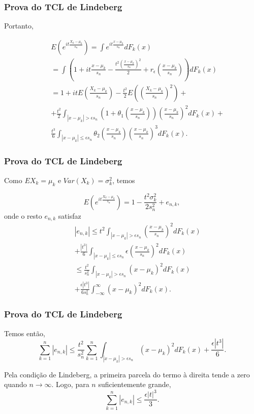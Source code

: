 \begin{frame}
\frametitle{\textbf{Prova do TCL de Lindeberg}}
\baselineskip=13pt
\begin{block}{}


Portanto,

\begin{eqnarray}
& & E(e^{it\frac{X_k-\mu_k}{s_n}})=\int
e^{it\frac{x-\mu_k}{s_n}}dF_k(x)\nonumber\\
& & =\int
(1+it\frac{x-\mu_k}{s_n}-\frac{t^2(\frac{x-\mu_k}{s_n})^2}{2}+ r_{\epsilon}(\frac{x-\mu_k}{s_n}))dF_k(x) \nonumber
\\
& &= 1+it
E(\frac{X_k-\mu_k}{s_n})-\frac{t^2}{2}E((\frac{X_k-\mu_k}{s_n})^2)+\nonumber\\
& & + \frac{t^2}{2}\int_{|x-\mu_k|>\epsilon
s_n}(1+\theta_1(\frac{x-\mu_k}{s_n}))(\frac{x-\mu_k}{s_n})^2dF_k(x)+\nonumber
\\
& & \frac{t^3}{6}\int_{|x-\mu_k|\leq\epsilon s_n}
\theta_2(\frac{x-\mu_k}{s_n})(\frac{x-\mu_k}{s_n})^3dF_k(x).\nonumber
\end{eqnarray}

\end{block}
\end{frame}

\begin{frame}
\frametitle{\textbf{Prova do TCL de Lindeberg}}
\baselineskip=13pt
\begin{block}{}


Como $EX_k=\mu_k$ e $Var(X_k)=\sigma_k^2$, temos

$$E(e^{it\frac{X_k-\mu_k}{s_n}})=1-\frac{t^2\sigma_k^2}{2s_n^2}+e_{n,k},$$
onde o resto $e_{n,k}$ satisfaz
\begin{eqnarray}
& & |e_{n,k}|\leq t^2\int_{|x-\mu_k|>\epsilon
s_n}(\frac{x-\mu_k}{s_n})^2dF_k(x)\nonumber\\
& & +\frac{|t^3|}{6}\int_{|x-\mu_k|\leq\epsilon
s_n}\epsilon(\frac{x-\mu_k}{s_n})^2dF_k(x) \nonumber \\
& & \leq \frac{t^2}{s_n^2}\int_{|x-\mu_k|>\epsilon
s_n}(x-\mu_k)^2dF_k(x)\nonumber\\
& & +\frac{\epsilon|t^3|}{6s_n^2}\int_{-\infty}^{\infty}(x-\mu_k)^2dF_k(x).\nonumber
\end{eqnarray}

\end{block}
\end{frame}

\begin{frame}
\frametitle{\textbf{Prova do TCL de Lindeberg}}
\baselineskip=13pt
\begin{block}{}


Temos então,
$$\sum_{k=1}^{n}|e_{n,k}|\leq \frac{t^2}{s_n^2}\sum_{k=1}^{n}\int_{|x-\mu_k|>\epsilon
s_n}(x-\mu_k)^2dF_k(x)+\frac{\epsilon|t^3|}{6}.$$

Pela condição de Lindeberg, a primeira parcela do termo à direita
tende a zero quando $n\rightarrow \infty$. Logo, para $n$
suficientemente grande,
$$\sum_{k=1}^{n}|e_{n,k}|\leq \frac{\epsilon|t|^3}{3}.$$

\end{block}
\end{frame}

